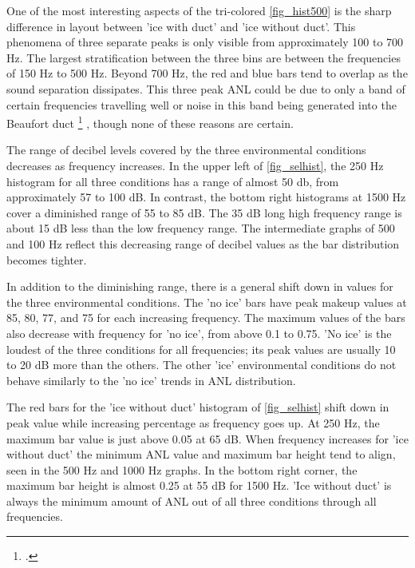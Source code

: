 
One of the most interesting aspects of the tri-colored \autoref{fig_hist500} is the sharp difference in layout between 'ice with duct' and 'ice without duct'. This phenomena of three separate peaks is only visible from approximately 100 to 700 Hz. The largest stratification between the three bins are between the frequencies of 150 Hz to 500 Hz. Beyond 700 Hz, the red and blue bars tend to overlap as the sound separation dissipates. This three peak ANL could be due to only a band of certain frequencies travelling well or noise in this band being generated into the Beaufort duct \footcite{beaufortduct} , though none of these reasons are certain.

The range of decibel levels covered by the three environmental conditions decreases as frequency increases. In the upper left of \autoref{fig_selhist}, the 250 Hz histogram for all three conditions has a range of almost 50 db, from approximately 57 to 100 dB. In contrast, the bottom right histograms at 1500 Hz cover a diminished range of 55 to 85 dB. The 35 dB long high frequency range is about 15 dB less than the low frequency range. The intermediate graphs of 500 and 100 Hz reflect this decreasing range of decibel values as the bar distribution becomes tighter.

In addition to the diminishing range, there is a general shift down in values for the three environmental conditions. The 'no ice' bars have peak makeup values at 85, 80, 77, and 75 for each increasing frequency. The maximum values of the bars also decrease with frequency for 'no ice', from above 0.1 to 0.75. 'No ice' is the loudest of the three conditions for all frequencies; its peak values are usually 10 to 20 dB more than the others. The other 'ice' environmental conditions do not behave similarly to the 'no ice' trends in ANL distribution.

The red bars for the 'ice without duct' histogram of \autoref{fig_selhist} shift down in peak value while increasing percentage as frequency goes up. At 250 Hz, the maximum bar value is just above 0.05 at 65 dB. When frequency increases for 'ice without duct' the minimum ANL value and maximum bar height tend to align, seen in the 500 Hz and 1000 Hz graphs. In the bottom right corner, the maximum bar height is almost 0.25 at 55 dB for 1500 Hz. 'Ice without duct' is always the minimum amount of ANL out of all three conditions through all frequencies.

